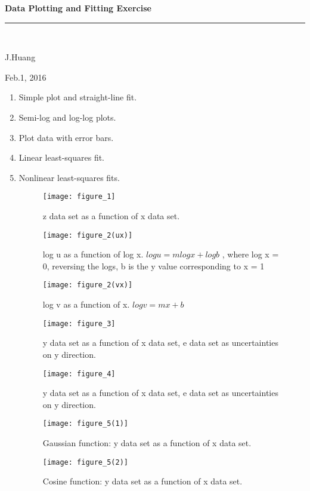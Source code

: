 \documentclass[aps,secnumarabic,balancelastpage,amsmath,amssymb,nofootinbib]{revtex4-1}
\begin{document}
\thispagestyle{empty}
\begin{center}
{\large \bf Data Plotting and Fitting Exercise}
\rule{\columnwidth}{0.5pt}\\[-15mm]
\item\textsf{J.Huang}
\item\textsf{Feb.1, 2016}
\end{center}

\begin{enumerate} 
\item \textsf{Simple plot and straight-line fit.}
\item \textsf{Semi-log and log-log plots.}
\item \textsf{Plot data with error bars.}
\item \textsf{Linear least-squares fit.}
\item \textsf{Nonlinear least-squares fits.}

\begin{figure}
\texttt{[image: figure\_1]}
\caption{z data set as a function of x data set.}
\label{fig:figure_1}
\end{figure}

\begin{figure}
\texttt{[image: figure\_2(ux)]}
\caption{log u as a function of log x. $log u = mlog x + log b$ , where log x = 0, reversing the logs, b is the y value corresponding to x = 1}
\label{fig:figure_2(ux)}
\end{figure}

\begin{figure}
\texttt{[image: figure\_2(vx)]}
\caption{log v as a function of x. $log v = mx + b$}
\label{fig:figure_2(vx)}
\end{figure}

\begin{figure}
\texttt{[image: figure\_3]}
\caption{ y data set as a function of x data set, e data set as uncertainties on y direction.}
\label{fig:figure_3}
\end{figure}

\begin{figure}
\texttt{[image: figure\_4]}
\caption{y data set as a function of x data set, e data set as uncertainties on y direction.}
\label{fig:figure_4}
\end{figure}

\begin{figure}
\texttt{[image: figure\_5(1)]}
\caption{Gaussian function: y data set as a function of x data set.}
\label{fig:figure_5(1)}
\end{figure}

\begin{figure}
\texttt{[image: figure\_5(2)]}
\caption{Cosine function: y data set as a function of x data set.}
\label{fig:figure_5(2)}
\end{figure}




\end{enumerate}
\end{document}
